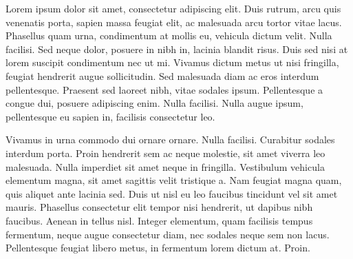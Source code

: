 Lorem ipsum dolor sit amet, consectetur adipiscing elit. Duis rutrum, arcu quis venenatis porta, sapien massa feugiat elit, ac malesuada arcu tortor vitae lacus. Phasellus quam urna, condimentum at mollis eu, vehicula dictum velit. Nulla facilisi. Sed neque dolor, posuere in nibh in, lacinia blandit risus. Duis sed nisi at lorem suscipit condimentum nec ut mi. Vivamus dictum metus ut nisi fringilla, feugiat hendrerit augue sollicitudin. Sed malesuada diam ac eros interdum pellentesque. Praesent sed laoreet nibh, vitae sodales ipsum. Pellentesque a congue dui, posuere adipiscing enim. Nulla facilisi. Nulla augue ipsum, pellentesque eu sapien in, facilisis consectetur leo.

Vivamus in urna commodo dui ornare ornare. Nulla facilisi. Curabitur sodales interdum porta. Proin hendrerit sem ac neque molestie, sit amet viverra leo malesuada. Nulla imperdiet sit amet neque in fringilla. Vestibulum vehicula elementum magna, sit amet sagittis velit tristique a. Nam feugiat magna quam, quis aliquet ante lacinia sed. Duis ut nisl eu leo faucibus tincidunt vel sit amet mauris. Phasellus consectetur elit tempor nisi hendrerit, ut dapibus nibh faucibus. Aenean in tellus nisl. Integer elementum, quam facilisis tempus fermentum, neque augue consectetur diam, nec sodales neque sem non lacus. Pellentesque feugiat libero metus, in fermentum lorem dictum at. Proin.